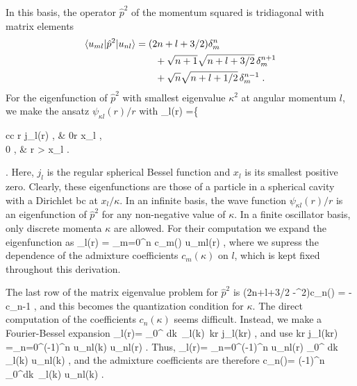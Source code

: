 	In this basis, the operator $\hat{p}^2$ of the momentum squared is
	tridiagonal with matrix elements
	\begin{align}
	\langle u_{ml}|\hat{p}^2|u_{nl}\rangle &= (2n+l+3/2)\delta_m^n \nonumber\\
	   & \qquad \null +\sqrt{n+1}
	   \sqrt{n+l+3/2}\,\delta_m^{n+1} \nonumber \\
	  & \qquad \null +\sqrt{n}\sqrt{n+l+1/2}\,\delta_m^{n-1} \;.
	\end{align}
	For the eigenfunction of $\hat{p}^2$ with smallest eigenvalue
	$\kappa^2$ at angular momentum $l$, we make the ansatz
	$\psi_{\kappa l}(r)/r$ with
	\bea
	\label{eigen}
	\psi_{\kappa l}(r) =\left\{\begin{array}{cc}
	\kappa r j_l(\kappa r) \;, & 0\le \kappa r \le x_l \;, \\
	0 \;, & \kappa r > x_l \;.\end{array}\right.
	\eea
	Here, $j_l$ is the regular spherical Bessel function and $x_l$ is its
	smallest positive zero.  Clearly, these eigenfunctions are those of a
	particle in a spherical cavity with a Dirichlet bc at $x_l/\kappa$. In
	an infinite basis, the wave function $\psi_{\kappa l}(r)/r$ is an
	eigenfunction of $\hat{p}^2$ for any non-negative value of $\kappa$.
	In a finite oscillator basis, only discrete momenta $\kappa$ are
	allowed.  For their computation we expand the eigenfunction as
	\beq
	\psi_{\kappa l}(r) = \sum_{m=0}^{n} c_m(\kappa) u_{ml}(r) \;,
	\eeq
	where we supress the dependence of the admixture coefficients
	$c_m(\kappa)$ on $l$, which is kept fixed throughout this derivation.

	The last row of the matrix eigenvalue problem for $\hat{p}^2$ is
	\beq
	\label{quantize}
	(2n+l+3/2 -\kappa^2)c_n(\kappa) = -\, c_{n-1} \;,
	\eeq
	and this becomes the quantization condition for $\kappa$.  The direct
	computation of the coefficients $c_n(\kappa)$ seems difficult.
	Instead, we make a Fourier-Bessel expansion
	\beq
	\label{fourierbessel}
	\psi_{\kappa l}(r)= \sqrt{2\over \pi}\int\limits_0^\infty\! dk\,
	   \tilde{\psi}_{\kappa l}(k)\, kr j_l(kr) \;,
	\eeq
	and use
	\beq
	kr j_l(kr) =\sum_{n=0}^\infty (-1)^n u_{nl}(k) u_{nl}(r) \;.
	\eeq
	Thus,
	\beq
	\psi_{\kappa l}(r)= \sum_{n=0}^\infty (-1)^n u_{nl}(r)
	\int\limits_0^\infty\! dk\, \tilde{\psi}_{\kappa l}(k) u_{nl}(k) \;,
	\eeq
	and the admixture coefficients are therefore
	\beq
	c_n(\kappa)= (-1)^n \int\limits_0^\infty dk\, \tilde{\psi}_{\kappa l}(k)
	u_{nl}(k) \;.
	\eeq

